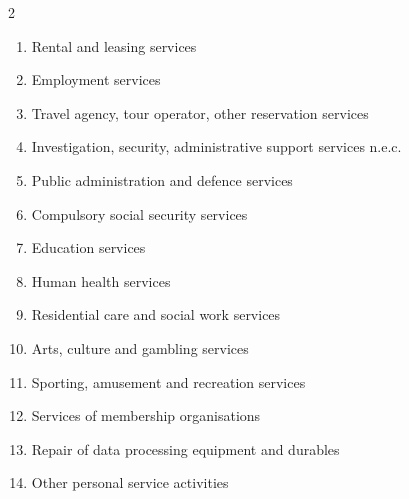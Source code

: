 \documentclass{article}
\begin{document}
\begin{multicols}{2}
\begin{enumerate}[leftmargin=*,itemsep=0pt,parsep=0pt]
\item Rental and leasing services
\item Employment services
\item Travel agency, tour operator, other reservation services
\item Investigation, security, administrative support services n.e.c.
\item Public administration and defence services
\item Compulsory social security services
\item Education services
\item Human health services
\item Residential care and social work services
\item Arts, culture and gambling services
\item Sporting, amusement and recreation services
\item Services of membership organisations
\item Repair of data processing equipment and durables
\item Other personal service activities
\end{enumerate}

\end{multicols}
\end{document}
